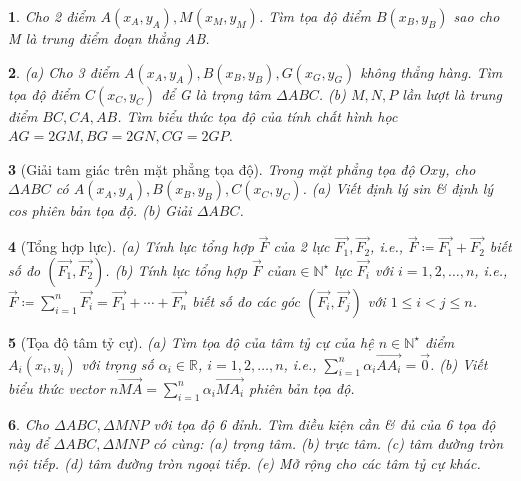 \documentclass{article}
\newtheorem{baitoan}{}
\begin{document}
\begin{baitoan}
	Cho 2 điểm $A(x_A,y_A),M(x_M,y_M)$. Tìm tọa độ điểm $B(x_B,y_B)$ sao cho M là trung điểm đoạn thẳng AB.
\end{baitoan}

\begin{baitoan}
	(a) Cho 3 điểm $A(x_A,y_A),B(x_B,y_B),G(x_G,y_G)$ không thẳng hàng. Tìm tọa độ điểm $C(x_C,y_C)$ để G là trọng tâm $\Delta ABC$. (b) $M,N,P$ lần lượt là trung điểm $BC,CA,AB$. Tìm biểu thức tọa độ của tính chất hình học $AG = 2GM,BG = 2GN,CG = 2GP$.
\end{baitoan}

\begin{baitoan}[Giải tam giác trên mặt phẳng tọa độ]
	Trong mặt phẳng tọa độ $Oxy$, cho $\Delta ABC$ có $A(x_A,y_A),B(x_B,y_B),C(x_C,y_C)$. (a) Viết định lý sin \& định lý cos phiên bản tọa độ. (b) Giải $\Delta ABC$.
\end{baitoan}

\begin{baitoan}[Tổng hợp lực]
	(a) Tính lực tổng hợp $\vec{F}$ của 2 lực $\overrightarrow{F_1},\overrightarrow{F_2}$, i.e., $\overrightarrow{F}\coloneqq\overrightarrow{F_1} + \overrightarrow{F_2}$ biết số đo $( \overrightarrow{F_1},\overrightarrow{F_2})$. (b) Tính lực tổng hợp $\vec{F}$ của$n\in\mathbb{N}^\star$ lực $\overrightarrow{F_i}$ với $i = 1,2,\ldots,n$, i.e., $\overrightarrow{F}\coloneqq\sum_{i=1}^n \overrightarrow{F_i} = \overrightarrow{F_1} + \cdots + \overrightarrow{F_n}$ biết số đo các góc $( \overrightarrow{F_i},\overrightarrow{F_j})$ với $1\le i < j\le n$.
\end{baitoan}

\begin{baitoan}[Tọa độ tâm tỷ cự]
	(a) Tìm tọa độ của tâm tỷ cự của hệ $n\in\mathbb{N}^\star$ điểm $A_i(x_i,y_i)$ với trọng số $\alpha_i\in\mathbb{R}$, $i = 1,2,\ldots,n$, i.e., $\sum_{i=1}^n \alpha_i\overrightarrow{AA_i} = \vec{0}$. (b) Viết biểu thức vector $n\overrightarrow{MA} = \sum_{i=1}^n \alpha_i\overrightarrow{MA_i}$ phiên bản tọa độ.
\end{baitoan}

\begin{baitoan}
	Cho $\Delta ABC,\Delta MNP$ với tọa độ 6 đỉnh. Tìm điều kiện cần \& đủ của 6 tọa độ này để $\Delta ABC,\Delta MNP$ có cùng: (a) trọng tâm. (b) trực tâm. (c) tâm đường tròn nội tiếp. (d) tâm đường tròn ngoại tiếp. (e) Mở rộng cho các tâm tỷ cự khác.
\end{baitoan}
\end{document}
